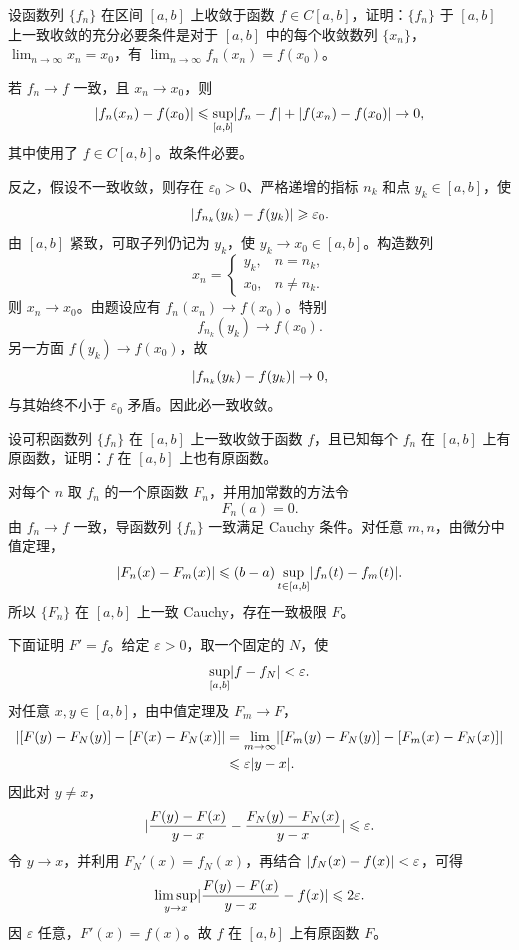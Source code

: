 \begin{xexercise}[7]
设函数列 $\{f_n\}$ 在区间 $[a,b]$ 上收敛于函数 $f\in C[a,b]$，证明：$\{f_n\}$ 于 $[a,b]$ 上一致收敛的充分必要条件是对于 $[a,b]$ 中的每个收敛数列 $\{x_n\}$，$\displaystyle\lim_{n\to\infty}x_n=x_0$，有 $\displaystyle\lim_{n\to\infty}f_n(x_n)=f(x_0)$。
\end{xexercise}
\begin{xsolution}
若 $f_n\to f$ 一致，且 $x_n\to x_0$，则
\[
  \lvert f_n(x_n)-f(x_0)\rvert
  \leqslant\sup_{[a,b]}\lvert f_n-f\rvert+\lvert f(x_n)-f(x_0)\rvert\to0,
\]
其中使用了 $f\in C[a,b]$。故条件必要。

反之，假设不一致收敛，则存在 $\varepsilon_0>0$、严格递增的指标 $n_k$ 和点 $y_k\in[a,b]$，使
\[
  \lvert f_{n_k}(y_k)-f(y_k)\rvert\geqslant\varepsilon_0.
\]
由 $[a,b]$ 紧致，可取子列仍记为 $y_k$，使 $y_k\to x_0\in[a,b]$。构造数列
\[
  x_n=
  \begin{cases}
    y_k,&n=n_k,\\
    x_0,&n\ne n_k.
  \end{cases}
\]
则 $x_n\to x_0$。由题设应有 $f_n(x_n)\to f(x_0)$。特别
\[
  f_{n_k}(y_k)\to f(x_0).
\]
另一方面 $f(y_k)\to f(x_0)$，故
\[
  \lvert f_{n_k}(y_k)-f(y_k)\rvert\to0,
\]
与其始终不小于 $\varepsilon_0$ 矛盾。因此必一致收敛。
\end{xsolution}


\begin{xexercise}[8]
设可积函数列 $\{f_n\}$ 在 $[a,b]$ 上一致收敛于函数 $f$，且已知每个 $f_n$ 在 $[a,b]$ 上有原函数，证明：$f$ 在 $[a,b]$ 上也有原函数。
\end{xexercise}
\begin{xsolution}
对每个 $n$ 取 $f_n$ 的一个原函数 $F_n$，并用加常数的方法令
\[
  F_n(a)=0.
\]
由 $f_n\to f$ 一致，导函数列 $\{f_n\}$ 一致满足 Cauchy 条件。对任意 $m,n$，由微分中值定理，
\[
  \lvert F_n(x)-F_m(x)\rvert
  \leqslant(b-a)\sup_{t\in[a,b]}\lvert f_n(t)-f_m(t)\rvert.
\]
所以 $\{F_n\}$ 在 $[a,b]$ 上一致 Cauchy，存在一致极限 $F$。

下面证明 $F'=f$。给定 $\varepsilon>0$，取一个固定的 $N$，使
\[
  \sup_{[a,b]}\lvert f-f_N\rvert<\varepsilon.
\]
对任意 $x,y\in[a,b]$，由中值定理及 $F_m\to F$，
\[
\begin{aligned}
  \lvert[F(y)-F_N(y)]-[F(x)-F_N(x)]\rvert
  &=\lim_{m\to\infty}\lvert[F_m(y)-F_N(y)]-[F_m(x)-F_N(x)]\rvert\\
  &\leqslant\varepsilon\lvert y-x\rvert.
\end{aligned}
\]
因此对 $y\ne x$，
\[
  \lvert\frac{F(y)-F(x)}{y-x}-\frac{F_N(y)-F_N(x)}{y-x}\rvert
  \leqslant\varepsilon.
\]
令 $y\to x$，并利用 $F_N'(x)=f_N(x)$，再结合 $\lvert f_N(x)-f(x)\rvert<\varepsilon$，可得
\[
  \limsup_{y\to x}\lvert\frac{F(y)-F(x)}{y-x}-f(x)\rvert\leqslant2\varepsilon.
\]
因 $\varepsilon$ 任意，$F'(x)=f(x)$。故 $f$ 在 $[a,b]$ 上有原函数 $F$。
\end{xsolution}


